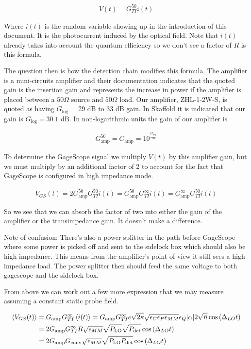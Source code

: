 \documentclass[12pt]{article}
\begin{document}
\begin{align}
V(t) = G_{TI}^{50} i(t)
\end{align}

Where $i(t)$ is the random variable showing up in the introduction of this document. It is the photocurrent induced by the optical field. Note that $i(t)$ already takes into account the quantum efficiency so we don't see a factor of $R$ is this formula.

The question then is how the detection chain modifies this formula. The amplifier is a mini-circuits amplifier and their documentation indicates that the quoted gain is the insertion gain and represents the increase in power if the amplifier is placed between a $50 \Omega$ source and $50 \Omega$ load. Our amplifier, ZHL-1-2W-S, is quoted as having $G_{\text{log}}$ =  29 dB to 33 dB gain. In Skaffold it is indicated that our gain is $G_{\text{log}} = 30.1 \text{ dB}$. In non-logarithmic units the gain of our amplifier is 

\begin{align}
G^{50}_{\text{amp}} = G_{\text{amp}} = 10^{\frac{G_{\text{log}}}{20}}
\end{align}

To determine the GageScope signal we multiply $V(t)$ by this amplifier gain, but we must multiply by an additional factor of 2 to account for the fact that GageScope is configured in high impedance mode.

\begin{align}
V_{GS}(t) = 2 G^{50}_{\text{amp}} G_{TI}^{50} i(t) =  G^{50}_{\text{amp}}G_{TI}^{\infty} i(t) = G^{\infty}_{\text{amp}}G_{TI}^{50} i(t)
\end{align}

So we see that we can absorb the factor of two into either the gain of the amplifier or the transimpedance gain. It doesn't make a difference.

Note of confusion: There's also a power splitter in the path before GageScope where some power is picked off and sent to the sidelock box which should also be high impedance. This means from the amplifier's point of view it still sees a high impedance load. The power splitter then should feed the same voltage to both gagescope and the sidelock box.

From above we can work out a few more expression that we may measure assuming a constant static probe field.

\begin{align}
\Braket{V_{GS}(t)} &= G_{\text{amp}} G_{TI}^{\infty} \Braket{i(t)} =  G_{\text{amp}}G_{TI}^{\infty} e \sqrt{2\kappa}\sqrt{\epsilon_C\epsilon_P\epsilon_{MM}} \epsilon_Q \lvert \alpha \rvert 2 \sqrt{\bar{n}} \cos\left(\Delta_{LO}t\right)\\
&= 2G_{\text{amp}}G_{TI}^{\infty}R \sqrt{\epsilon_{MM}} \sqrt{P_{\text{LO}}}\sqrt{P_{\text{det}}} \cos\left(\Delta_{LO}t\right)\\
&= 2G_{\text{amp}} G_{\text{conv}} \sqrt{\epsilon_{MM}} \sqrt{P_{\text{LO}}P_{\text{det}}} \cos\left(\Delta_{LO} t\right)
\end{align}
\end{document}
